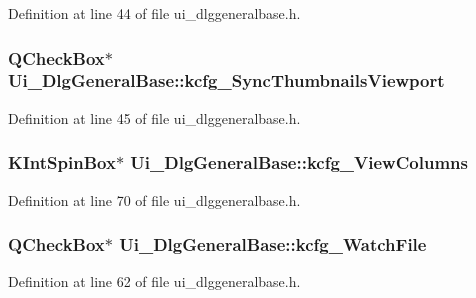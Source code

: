 Definition at line 44 of file ui\+\_\+dlggeneralbase.\+h.

\hypertarget{classUi__DlgGeneralBase_a3bd89dac60042cf193e8f294f8d255b1}{
\subsubsection[{kcfg\+\_\+\+Sync\+Thumbnails\+Viewport}]{\setlength{\rightskip}{0pt plus 5cm}Q\+Check\+Box$\ast$ Ui\+\_\+\+Dlg\+General\+Base\+::kcfg\+\_\+\+Sync\+Thumbnails\+Viewport}}\label{classUi__DlgGeneralBase_a3bd89dac60042cf193e8f294f8d255b1}


Definition at line 45 of file ui\+\_\+dlggeneralbase.\+h.

\hypertarget{classUi__DlgGeneralBase_a8951356ecfac9ee4a27ea0b2bca2e12e}{
\subsubsection[{kcfg\+\_\+\+View\+Columns}]{\setlength{\rightskip}{0pt plus 5cm}K\+Int\+Spin\+Box$\ast$ Ui\+\_\+\+Dlg\+General\+Base\+::kcfg\+\_\+\+View\+Columns}}\label{classUi__DlgGeneralBase_a8951356ecfac9ee4a27ea0b2bca2e12e}


Definition at line 70 of file ui\+\_\+dlggeneralbase.\+h.

\hypertarget{classUi__DlgGeneralBase_ad78f563114498d2bcc4350d8939ad2ec}{
\subsubsection[{kcfg\+\_\+\+Watch\+File}]{\setlength{\rightskip}{0pt plus 5cm}Q\+Check\+Box$\ast$ Ui\+\_\+\+Dlg\+General\+Base\+::kcfg\+\_\+\+Watch\+File}}\label{classUi__DlgGeneralBase_ad78f563114498d2bcc4350d8939ad2ec}


Definition at line 62 of file ui\+\_\+dlggeneralbase.\+h.

